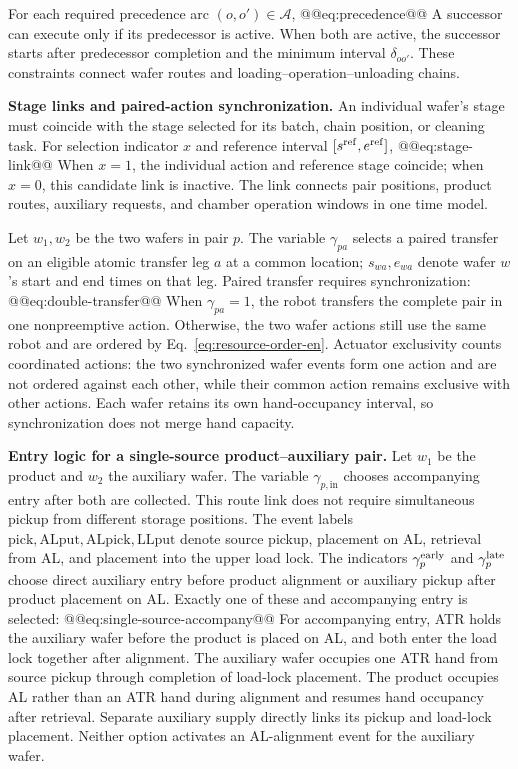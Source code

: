 For each required precedence arc $(o,o')\in\mathcal A$,
@@eq:precedence@@
A successor can execute only if its predecessor is active. When both are active, the successor starts after predecessor completion and the minimum interval $\delta_{oo'}$. These constraints connect wafer routes and loading--operation--unloading chains.

\noindent\textbf{Stage links and paired-action synchronization.}
An individual wafer's stage must coincide with the stage selected for its batch, chain position, or cleaning task. For selection indicator $x$ and reference interval $[s^{\rm ref},e^{\rm ref}]$,
@@eq:stage-link@@
When $x=1$, the individual action and reference stage coincide; when $x=0$, this candidate link is inactive. The link connects pair positions, product routes, auxiliary requests, and chamber operation windows in one time model.

Let $w_1,w_2$ be the two wafers in pair $p$. The variable $\gamma_{pa}$ selects a paired transfer on an eligible atomic transfer leg $a$ at a common location; $s_{wa},e_{wa}$ denote wafer $w$'s start and end times on that leg. Paired transfer requires synchronization:
@@eq:double-transfer@@
When $\gamma_{pa}=1$, the robot transfers the complete pair in one nonpreemptive action. Otherwise, the two wafer actions still use the same robot and are ordered by Eq.~\eqref{eq:resource-order-en}. Actuator exclusivity counts coordinated actions: the two synchronized wafer events form one action and are not ordered against each other, while their common action remains exclusive with other actions. Each wafer retains its own hand-occupancy interval, so synchronization does not merge hand capacity.

\noindent\textbf{Entry logic for a single-source product--auxiliary pair.}
Let $w_1$ be the product and $w_2$ the auxiliary wafer. The variable $\gamma_{p,\mathrm{in}}$ chooses accompanying entry after both are collected. This route link does not require simultaneous pickup from different storage positions. The event labels $\mathrm{pick,ALput,ALpick,LLput}$ denote source pickup, placement on AL, retrieval from AL, and placement into the upper load lock. The indicators $\gamma^{\rm early}_p$ and $\gamma^{\rm late}_p$ choose direct auxiliary entry before product alignment or auxiliary pickup after product placement on AL. Exactly one of these and accompanying entry is selected:
@@eq:single-source-accompany@@
For accompanying entry, ATR holds the auxiliary wafer before the product is placed on AL, and both enter the load lock together after alignment. The auxiliary wafer occupies one ATR hand from source pickup through completion of load-lock placement. The product occupies AL rather than an ATR hand during alignment and resumes hand occupancy after retrieval. Separate auxiliary supply directly links its pickup and load-lock placement. Neither option activates an AL-alignment event for the auxiliary wafer.

